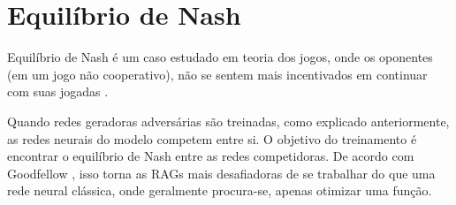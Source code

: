 \section{Equilíbrio de Nash}
\label{sec:nash}

Equilíbrio de Nash é um caso estudado em teoria dos jogos, onde os oponentes (em um jogo não cooperativo), não se sentem mais incentivados em continuar com suas jogadas \cite{chen_nash_2022, eldridge_nash_2022}. 

Quando redes geradoras adversárias são treinadas, como explicado anteriormente, as redes neurais do modelo competem entre si. O objetivo do treinamento é encontrar o equilíbrio de Nash entre as redes competidoras. De acordo com Goodfellow , isso torna as RAGs mais desafiadoras de se trabalhar do que uma rede neural clássica, onde geralmente procura-se, apenas otimizar uma função. 
